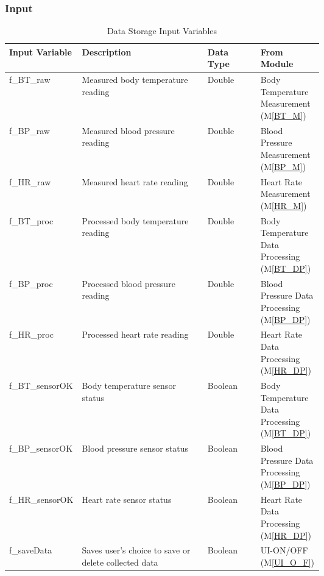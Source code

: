 \documentclass{article}
\begin{document}
\begin{description}
        \subsubsection{Input}
            \begin{longtable}{|l|p{0.4\linewidth}|l|p{0.2\linewidth}|}
            \caption{Data Storage Input Variables}
            \hline
            \textbf{Input Variable} & \textbf{Description} & \textbf {Data Type} & \textbf{From Module} \\
            \endhead
            \hline
            f\_BT\_raw   & Measured body temperature reading & Double & Body Temperature Measurement (M\ref{BT_M})\\
            \hline
            f\_BP\_raw   & Measured blood pressure reading & Double & Blood Pressure Measurement (M\ref{BP_M}) \\
            \hline
            f\_HR\_raw   & Measured heart rate reading & Double & Heart Rate Measurement (M\ref{HR_M})\\
            \hline
            f\_BT\_proc   & Processed body temperature reading & Double & Body Temperature Data Processing (M\ref{BT_DP})\\
            \hline
            f\_BP\_proc   & Processed blood pressure reading & Double & Blood Pressure Data Processing (M\ref{BP_DP})\\
            \hline
            f\_HR\_proc   & Processed heart rate reading & Double & Heart Rate Data Processing (M\ref{HR_DP})\\
            \hline
            f\_BT\_sensorOK   & Body temperature sensor status & Boolean & Body Temperature Data Processing (M\ref{BT_DP})\\
            \hline
            f\_BP\_sensorOK   & Blood pressure sensor status & Boolean & Blood Pressure Data Processing (M\ref{BP_DP})\\
            \hline
            f\_HR\_sensorOK   & Heart rate sensor status & Boolean & Heart Rate Data Processing (M\ref{HR_DP})\\
            \hline
            f\_saveData   & Saves user's choice to save or delete collected data & Boolean & UI-ON/OFF (M\ref{UI_O_F})\\
            \hline
            \end{longtable}
        
        \newpage

\end{description}
\end{document}
